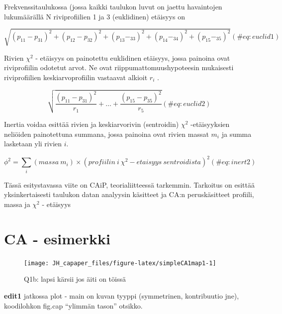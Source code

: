 \documentclass[
  finnish,
]{book}
\begin{document}
Frekvenssitaulukossa (jossa kaikki taulukon luvut on jaettu havaintojen
lukumäärällä N riviprofiilien 1 ja 3 (euklidinen) etäisyys on

\begin{equation}
 \sqrt{(p_{11} - p_{31})^2 + (p_{12} - p_{32})^2 + (p_{13} - _{33})^2+ (p_{14} - _{34})^2+ (p_{15} - _{35})^2}
 (\#eq:euclid1)
 \end{equation}

Rivien \(\chi^{2}\) - etäisyys on painotettu euklidinen etäisyys, jossa
painoina ovat riviprofiilin odotetut arvot. Ne ovat
riippumattomuushypoteesin mukaisesti riviprofiilien keskiarvoprofiilin
vastaavat alkioit \(r_{i}\) .

\begin{equation}
 \sqrt{\frac{(p_{11} - p_{31})^2} { r_{1}} + \dots + \frac{(p_{15} - p_{35})^2} {r_{5}}}
 (\#eq:euclid2)
\end{equation}

Inertia voidaa esittää rivien ja keskiarvorivin (sentroidin)
\(\chi^{2}\) -etäisyyksien neliöiden painotettuna summana, jossa
painoina ovat rivien massat \(m_{i}\) ja summa lasketaan yli rivien
\({i}\).

\begin{equation}
 \phi^{2} = \sum_{i} (massa \: m_{i}) \times (profiilin \: i \: \chi^{2} - etaisyys \: sentroidista)^{2}
 (\#eq:inert2)
\end{equation}

Tässä esitystavassa viite on CAiP, teorialiitteessä tarkemmin. Tarkoitus
on esittää yksinkertaisesti taulukon datan analyysin käsitteet ja CA:n
peruskäsitteet profiili, massa ja \(\chi^{2}\) - etäisyys

\hypertarget{ca---esimerkki}{%
\section{CA - esimerkki}\label{ca---esimerkki}}

\begin{figure}

{\centering \texttt{[image: JH\_capaper\_files/figure-latex/simpleCA1map1-1]} 

}

\caption{Q1b: lapsi kärsii jos äiti on töissä}\label{fig:simpleCA1map1}
\end{figure}

\textbf{edit1} jatkossa plot - main on kuvan tyyppi (symmetrinen,
kontribuutio jne), koodilohkon fig.cap ``ylimmän tason'' otsikko.
\end{document}
